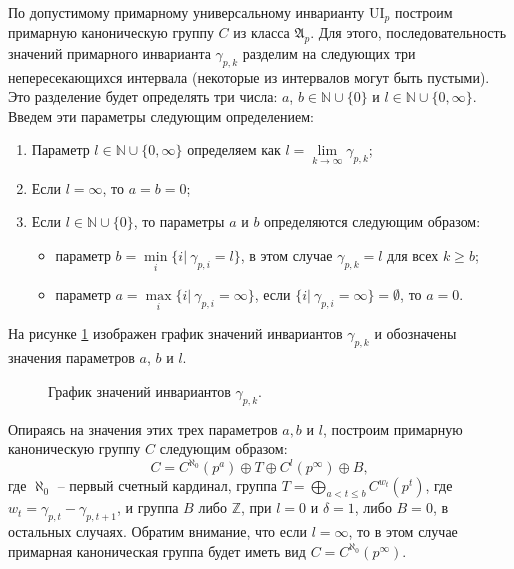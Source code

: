 \documentclass[a4paper,11pt,twoside]{article}
\def\A{{\mathfrak{A}}}
\def\Z{{\mathbb{Z}}}
\def\N{{\mathbb{N}}}
\def\ui{{\mathrm{UI}}}
\begin{document}
По допустимому примарному универсальному инварианту $\ui_p$ построим примарную каноническую группу $C$ из класса $\A_p$. Для этого, последовательность значений примарного инварианта $\gamma_{p,k}$ разделим на следующих три непересекающихся интервала (некоторые из интервалов могут быть пустыми). Это разделение будет определять три числа: $a$, $b \in \N \cup \{0\}$ и $l \in \N \cup \{0, \infty\}$. Введем эти параметры следующим определением:
\begin{enumerate}
\item Параметр $l \in \N \cup \{0, \infty\}$ определяем как $l = \lim\limits_{k \rightarrow \infty} \gamma_{p,k}$;
\item Если $l = \infty$, то $a = b = 0$;
\item Если $l \in \N \cup \{0\}$, то параметры $a$ и $b$ определяются следующим образом:
\begin{itemize}
\item параметр $b = \min\limits_{i} \{ i | \ \gamma_{p,i} = l\}$, в этом случае $\gamma_{p,k} = l$ для всех $k \geq b$;
\item параметр $a = \max\limits_{i} \{i | \ \gamma_{p,i} = \infty\}$, если $\{i | \ \gamma_{p,i} = \infty\} = \emptyset$, то $a = 0$.
\end{itemize}
\end{enumerate}

На рисунке \ref{pic:GammaPK} изображен график значений инвариантов $\gamma_{p,k}$ и обозначены значения параметров $a$, $b$ и $l$.

\begin{figure}[h!]
\centering
{}
\caption{График значений инвариантов $\gamma_{p,k}.$}\label{pic:GammaPK}
\end{figure}


Опираясь на значения этих трех параметров $a, b$ и $l$, построим примарную каноническую группу $C$ следующим образом:
$$C = C^{\aleph_0}(p^a) \oplus T \oplus C^l(p^\infty) \oplus B ,$$
где $\aleph_0$ -- первый счетный кардинал, группа $T = \bigoplus\limits_{ a < t \leq b} C^{w_t}(p^t)$, где $w_t = \gamma_{p,t} - \gamma_{p,t+1}$, и группа $B$ либо $\Z$, при $l = 0$ и $\delta = 1$, либо $B = 0$, в остальных случаях. Обратим внимание, что если $l = \infty$, то в этом случае примарная каноническая группа будет иметь вид $C = C^{\aleph_0}(p^\infty)$.
\end{document}
